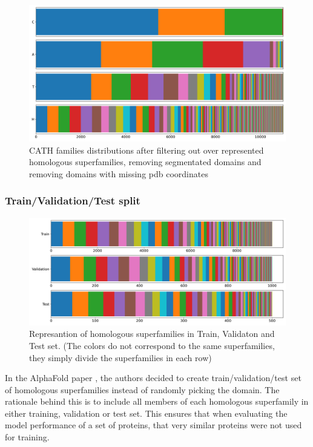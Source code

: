 \begin{figure}
    \centering
    \includegraphics[width=\linewidth]{imgs_tomas/cath_distributions_filtered.png}
    \caption{CATH families distributions after filtering out over represented homologous superfamilies, removing segmentated domains and removing domains with missing pdb coordinates}
    \label{fig:cath_filtered}
\end{figure}

\subsubsection{Train/Validation/Test split}

\begin{figure}
    \centering
    \includegraphics[width=\linewidth]{imgs_tomas/cath_distributions_trainvaltest.png}
    \caption{Represantion of homologous superfamilies in Train, Validaton and Test set. (The colors do not correspond to the same superfamilies, they simply divide the superfamilies in each row)}
    \label{fig:cath_trainvaltest}
\end{figure}

In the AlphaFold paper \cite{alphafold}, the authors decided to create train/validation/test set of homologous superfamilies instead of randomly picking the domain. 
The rationale behind this is to include all members of each homologous superfamily in either training, validation or test set. 
This ensures that when evaluating the model performance of a set of proteins, that very similar proteins were not used for training. 
    
